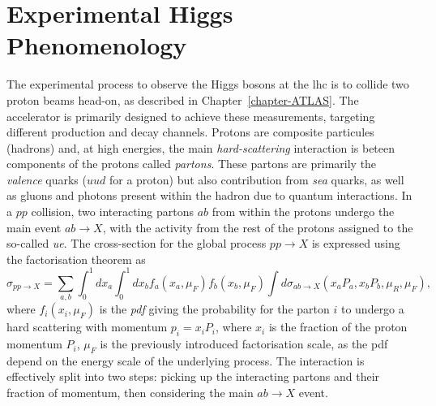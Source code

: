 \section{Experimental Higgs Phenomenology}
The experimental process to observe the Higgs bosons at the \gls{lhc} is to collide two proton beams head-on, as described in Chapter~\ref{chapter-ATLAS}. The accelerator is primarily designed to achieve these measurements, targeting different production and decay channels. Protons are composite particules (hadrons) and, at high energies, the main \textit{hard-scattering} interaction is beteen components of the protons called \textit{partons}. These partons are primarily the \textit{valence} quarks ($uud$ for a proton) but also contribution from \textit{sea} quarks, as well as gluons and photons present within the hadron due to quantum interactions. In a $pp$ collision, two interacting partons $ab$ from within the protons undergo the main event $ab \rightarrow X$, with the activity from the rest of the protons assigned to the so-called \textit{\gls{ue}}. The cross-section for the global process $pp \rightarrow X$ is expressed using the factorisation theorem \cite{collins2004factorization} as 
\begin{equation}
\sigma_{pp\rightarrow X} = \sum_{a,b} \int_0^1 dx_a \int_0^1 dx_b f_a(x_a, \mu_F) f_b(x_b, \mu_F) \int d\sigma_{ab\rightarrow X}\left(x_aP_a, x_bP_b, \mu_R, \mu_F \right),
\end{equation}
where $f_i(x_i, \mu_F)$ is the \textit{\gls{pdf}} giving the probability for the parton $i$ to undergo a hard scattering with momentum $p_i = x_i P_i$, where $x_i$ is the fraction of the proton momentum $P_i$, $\mu_F$ is the previously introduced factorisation scale, as the \gls{pdf} depend on the energy scale of the underlying process. The interaction is effectively split into two steps: picking up the interacting partons and their fraction of momentum, then considering the main $ab \rightarrow X$ event.\\

